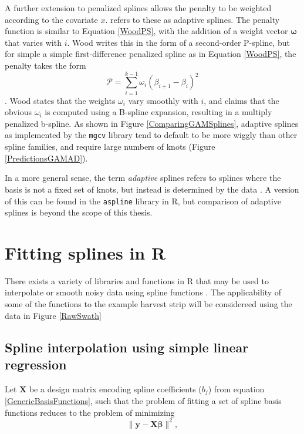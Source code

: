 \documentclass[phdcss]{SDSUThesis}
\begin{document}
A further extension to penalized splines allows the penalty to be weighted according to the covariate $x$. \cite{wood-2017} refers to these as adaptive splines. The penalty function is similar to Equation \ref{WoodPS}, with the addition of a weight vector $\mathbf{\omega}$ that varies with $i$. Wood \cite{wood-2017} writes this in the form of a second-order P-spline, but for simple a simple first-difference penalized spline as in Equation \ref{WoodPS}, the penalty takes the form
\begin{equation}\label{WoodAD}
\mathcal{P} = \sum_{i=1}^{k-1} \omega_i \left( \beta_{i+1} - \beta_{i} \right)^2
\end{equation}.
Wood \cite{wood-2017} states that the weights $\omega_i$ vary smoothly with $i$, and claims that the obvious $\omega_i$ is computed using a B-spline expansion, resulting in a multiply penalized b-spline. As shown in Figure \ref{ComparingGAMSplines}, adaptive splines as implemented by the \texttt{mgcv} library tend to default to be more wiggly than other spline families, and require large numbers of knots (Figure \ref{PredictionsGAMAD}).

In a more general sense, the term \textit{adaptive} splines refers to splines where the basis is not a fixed set of knots, but instead is determined by the data \cite{mammen-1997}. A version of this can be found in the \texttt{aspline} library in R, but comparison of adaptive splines is beyond the scope of this thesis.

\clearpage

\section{Fitting splines in R}

There exists a variety of libraries and functions in R that may be used to interpolate or smooth noisy data using spline functions \cite{perperoglou-2019}. The applicability of some of the functions to the example harvest strip will be considereed using the data in Figure \ref{RawSwath}

\subsection{Spline interpolation using simple linear regression}

Let $\mathbf{X}$ be a design matrix encoding spline coefficients ($b_j$) from equation \ref{GenericBasisFunctions}, such that the problem of fitting a set of spline basis functions reduces to the problem of minimizing 
\begin{equation}\label{OLSModel}
\lVert\mathbf{y} - \mathbf{X} \mathbf{\beta} \rVert ^2,
\end{equation}
 
\end{document}

